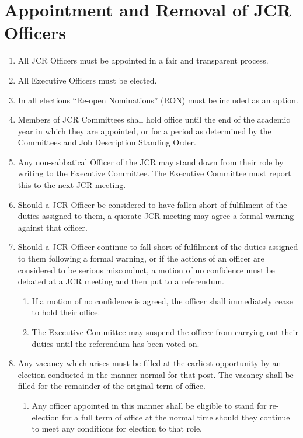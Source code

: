 \documentclass[12pt]{article}  %
\begin{document}
\section{Appointment and Removal of JCR Officers}
\begin{enumerate}
    \item All JCR Officers must be appointed in a fair and transparent process.
    \item All Executive Officers must be elected.
    \item In all elections “Re-open Nominations” (RON) must be included as an option.
    \item Members of JCR Committees shall hold office until the end of the academic year in which they are appointed, or for a period as determined by the Committees and Job Description Standing Order.
    \item Any non-sabbatical Officer of the JCR may stand down from their role by writing to the Executive Committee. The Executive Committee must report this to the next JCR meeting.
    \item Should a JCR Officer be considered to have fallen short of fulfilment of the duties assigned to them, a quorate JCR meeting may agree a formal warning against that officer.
    \item Should a JCR Officer continue to fall short of fulfilment of the duties assigned to them following a formal warning, or if the actions of an officer are considered to be serious misconduct, a motion of no confidence must be debated at a JCR meeting and then put to a referendum.
    \begin{enumerate}
        \item If a motion of no confidence is agreed, the officer shall immediately cease to hold their office.
        \item The Executive Committee may suspend the officer from carrying out their duties until the referendum has been voted on.
    \end{enumerate}
    \item Any vacancy which arises must be filled at the earliest opportunity by an election conducted in the manner normal for that post. The vacancy shall be filled for the remainder of the original term of office.
    \begin{enumerate}
        \item Any officer appointed in this manner shall be eligible to stand for re-election for a full term of office at the normal time should they continue to meet any conditions for election to that role.

\end{enumerate}
\end{enumerate}
\end{document}
